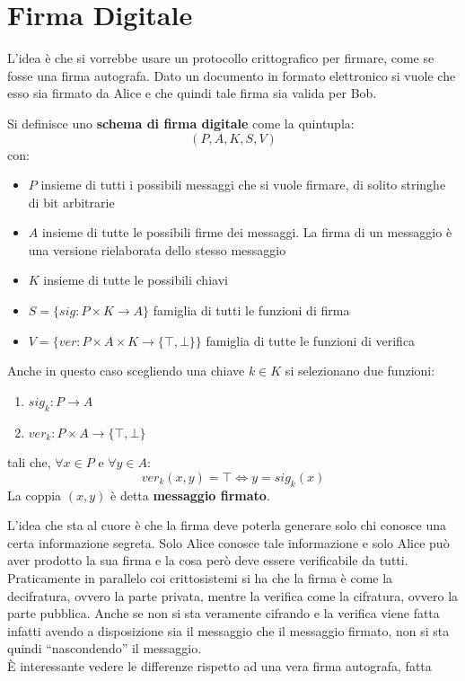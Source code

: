 \documentclass[a4paper,12pt, oneside]{book}
\begin{document}
\section{Firma Digitale}
L'idea è che si vorrebbe usare un protocollo crittografico per firmare, come se
fosse una firma autografa. Dato un documento in formato elettronico si vuole che
esso sia firmato da Alice e che quindi tale firma sia valida per Bob.
\begin{definizione}
  Si definisce uno \textbf{schema di firma digitale} come la quintupla:
  \[(P,A,K,S,V)\]
  con:
  \begin{itemize}
    \item $P$ insieme di tutti i possibili messaggi che si vuole firmare, di
    solito stringhe di bit arbitrarie
    \item $A$ insieme di tutte le possibili firme dei messaggi. La firma di un
    messaggio è una versione rielaborata dello stesso messaggio
    \item $K$ insieme di tutte le possibili chiavi
    \item $S=\{sig:P\times K\to A\}$ famiglia di tutti le funzioni di firma
    \item $V=\{ver:P\times A\times K\to\{\top,\bot\}\}$ famiglia di tutte le
    funzioni di verifica
  \end{itemize}
  Anche in questo caso scegliendo una chiave $k\in K$ si selezionano due
  funzioni:
  \begin{enumerate}
    \item $sig_k:P\to A$
    \item $ver_k:P\times A\to\{\top,\bot\}$
  \end{enumerate}
  tali che, $\forall x\in P$ e $\forall y\in A$:
  \[ver_k(x,y)=\top \iff y=sig_k(x)\]
  La coppia $(x,y)$ è detta \textbf{messaggio firmato}.
\end{definizione}
L'idea che sta al cuore è che la firma deve poterla generare solo chi conosce
una certa informazione segreta. Solo Alice conosce tale informazione e solo
Alice può aver prodotto la sua firma e la cosa però deve essere verificabile da
tutti. Praticamente in parallelo coi crittosistemi si ha che la firma è come la
decifratura, ovvero la parte privata, mentre la verifica come la cifratura,
ovvero la parte pubblica. Anche se non si sta veramente cifrando e la verifica
viene fatta infatti avendo a disposizione sia il messaggio che il messaggio
firmato, non si sta quindi ``nascondendo'' il messaggio.\\  
È interessante vedere le differenze rispetto ad una vera firma autografa, fatta
\end{document}
